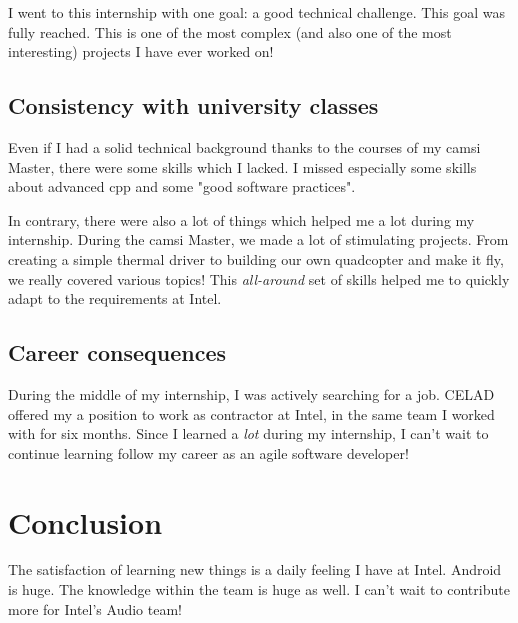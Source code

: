 I went to this internship with one goal: a good technical challenge. This goal
was fully reached. This is one of the most complex (and also one of the most
interesting) projects I have ever worked on!

\subsection{Consistency with university classes}
Even if I had a solid technical background thanks to the courses of my
\gls{camsi} Master, there were some skills which I lacked.
I missed especially some skills about advanced \gls{cpp} and some "good software practices".

In contrary, there were also a lot of things which helped me a lot during
my internship.  During the \gls{camsi} Master, we made a lot of stimulating
projects. From creating a simple thermal driver to building our own quadcopter
and make it fly, we really covered various topics! This \emph{all-around} set of
skills helped me to quickly adapt to the requirements at Intel.

\subsection{Career consequences}
During the middle of my internship, I was actively searching for a job. CELAD offered my a position to work
as contractor at Intel, in the same team I worked with for six months.
Since I learned a \emph{lot} during my internship, I can't wait to continue learning follow my career
as an agile software developer!

\section{Conclusion}
The satisfaction of learning new things is a daily feeling I have at
Intel. Android is huge. The knowledge within the team is huge as well. I can't
wait to contribute more for Intel's Audio team!
